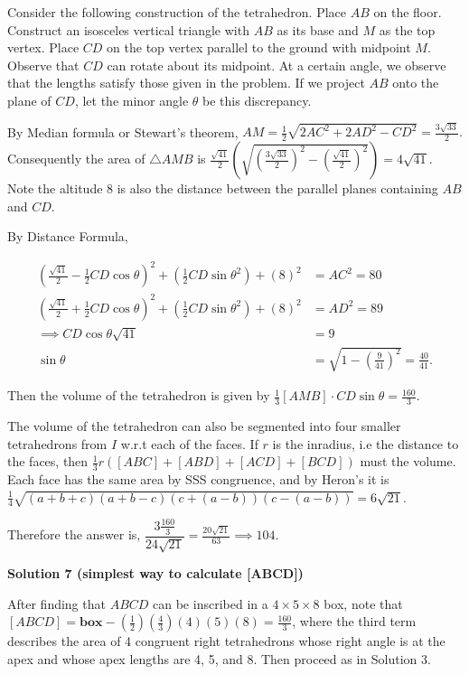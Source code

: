 \begin{enumerate}
Consider the following construction of the tetrahedron. Place $AB$ on the floor. Construct an isosceles vertical triangle with $AB$ as its base and $M$ as the top vertex. Place $CD$ on the top vertex parallel to the ground with midpoint $M.$ Observe that $CD$ can rotate about its midpoint. At a certain angle, we observe that the lengths satisfy those given in the problem. If we project $AB$ onto the plane of $CD$, let the minor angle $\theta$ be this discrepancy.

 By Median formula or Stewart's theorem, $AM = \frac{1}{2}\sqrt{2AC^2 + 2AD^2 - CD^2} = \frac{3\sqrt{33}}{2}.$ Consequently the area of $\triangle AMB$ is $\frac{\sqrt{41}}{2} \left (\sqrt{(\frac{3\sqrt{33}}{2})^2 - (\frac{\sqrt{41}}{2})^2} \right ) = 4\sqrt{41}.$ Note the altitude $8$ is also the distance between the parallel planes containing $AB$ and $CD.$

 By Distance Formula,

 
 \begin{align*} (\frac{\sqrt{41}}{2} - \frac{1}{2}CD \cos{\theta})^2 + (\frac{1}{2}CD \sin{\theta}^2) + (8)^2 &= AC^2 = 80 \\ (\frac{\sqrt{41}}{2} + \frac{1}{2}CD \cos{\theta})^2 + (\frac{1}{2}CD \sin{\theta}^2) + (8)^2 &= AD^2 = 89 \\ \implies CD \cos{\theta} \sqrt{41} &= 9 \\ \sin{\theta} &= \sqrt{1 - (\frac{9}{41})^2} = \frac{40}{41}. \end{align*}


 Then the volume of the tetrahedron is given by $\frac{1}{3} [AMB] \cdot CD \sin{\theta} = \frac{160}{3}.$

 The volume of the tetrahedron can also be segmented into four smaller tetrahedrons from $I$ w.r.t each of the faces. If $r$ is the inradius, i.e the distance to the faces, then $\frac{1}{3} r([ABC] + [ABD] + [ACD] + [BCD])$ must the volume. Each face has the same area by SSS congruence, and by Heron's it is $\frac{1}{4}\sqrt{(a + b + c)(a + b - c)(c + (a-b))(c -(a - b))} = 6\sqrt{21}.$

 Therefore the answer is, $\dfrac{3 \frac{160}{3}}{24 \sqrt{21}} = \frac{20\sqrt{21}}{63} \implies \boxed{104}.$




\textbf{Solution 7 (simplest way to calculate [ABCD])}

After finding that $ABCD$ can be inscribed in a $4\times5\times8$ box, note that $[ABCD]=\mathbf{box}-(\frac{1}{2})(\frac{4}{3})(4)(5)(8)=\frac{160}{3}$, where the third term describes the area of 4 congruent right tetrahedrons whose right angle is at the apex and whose apex lengths are 4, 5, and 8. Then proceed as in Solution 3.


\end{enumerate}
